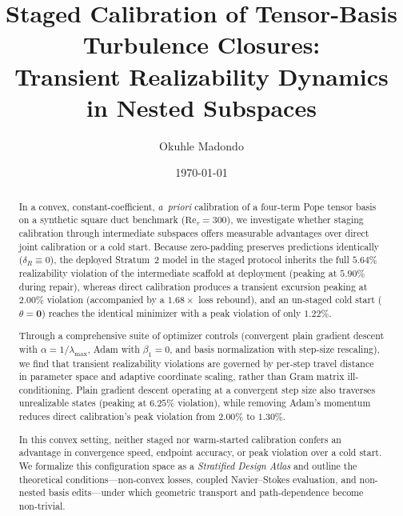 \documentclass[preprint,aps,prb,longbibliography,superscriptaddress]{revtex4-2}
\begin{document}
\title{Staged Calibration of Tensor-Basis Turbulence Closures:\\
Transient Realizability Dynamics in Nested Subspaces}

\author{Okuhle Madondo}

\date{\today}

\begin{abstract}
In a convex, constant-coefficient, \emph{a~priori} calibration of a four-term
Pope tensor basis on a synthetic square duct benchmark ($\mathrm{Re}_\tau = 300$),
we investigate whether staging calibration through intermediate subspaces
offers measurable advantages over direct joint calibration or a cold start.
Because zero-padding preserves predictions identically ($\delta_R \equiv 0$),
the deployed Stratum~2 model in the staged protocol inherits the full $5.64\%$
realizability violation of the intermediate scaffold at deployment (peaking at
$5.90\%$ during repair), whereas direct calibration produces a transient
excursion peaking at $2.00\%$ violation (accompanied by a $1.68\times$ loss
rebound), and an un-staged cold start ($\theta = \mathbf{0}$) reaches the
identical minimizer with a peak violation of only $1.22\%$.

Through a comprehensive suite of optimizer controls (convergent plain gradient
descent with $\alpha = 1/\lambda_{\max}$, Adam with $\beta_1 = 0$, and basis
normalization with step-size rescaling), we find that transient realizability
violations are governed by per-step travel distance in parameter space and
adaptive coordinate scaling, rather than Gram matrix ill-conditioning. Plain
gradient descent operating at a convergent step size also traverses
unrealizable states (peaking at $6.25\%$ violation), while removing Adam's
momentum reduces direct calibration's peak violation from $2.00\%$ to $1.30\%$.

In this convex setting, neither staged nor warm-started calibration confers an
advantage in convergence speed, endpoint accuracy, or peak violation over a
cold start. We formalize this configuration space as a \emph{Stratified Design
Atlas} and outline the theoretical conditions---non-convex losses, coupled
Navier--Stokes evaluation, and non-nested basis edits---under which geometric
transport and path-dependence become non-trivial.
\end{abstract}
\end{document}
